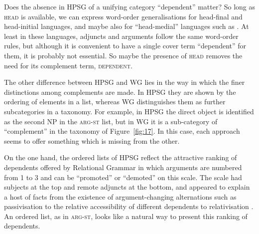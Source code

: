 \documentclass[output=paper
 	        ,biblatex
                ,babelshorthands
                ,newtxmath
                ,draftmode
                ,colorlinks, citecolor=brown
]{langscibook}
\begin{document}
Does the absence in HPSG of a unifying category ``dependent'' matter? So long as \textsc{head} is
available, we can express word-order generalisations for head-final and head-initial languages, and
maybe also for ``head-medial'' languages such as  \citep[172]{Hudson2010b-u}. At least
in these languages, adjuncts and arguments follow the same word-order rules, but although it is
convenient to have a single cover term ``dependent'' for them, it is probably not essential. So
maybe the presence of \textsc{head} removes the need for its complement term, \textsc{dependent}.

The other difference between HPSG and WG lies in the way in which the finer distinctions among
complements are made. In HPSG they are shown by the ordering of elements in a list, whereas WG
distinguishes them as further subcategories in a taxonomy. For example, in HPSG the direct object is
identified as the second NP in the \textsc{arg-st} list, but in WG it is a sub-category of
``complement'' in the taxonomy of Figure~\ref{fig:17}. In this case, each approach seems to offer
something which is missing from the other.

On the one hand, the ordered lists of HPSG reflect the attractive ranking of dependents offered by
Relational Grammar \citep{PP83a-u,Blake1990} in which arguments are numbered from 1 to 3 and can be
``promoted'' or ``demoted'' on this scale. The scale had subjects at the top and remote adjuncts at
the bottom, and appeared to explain a host of facts from the existence of argument-changing
alternations such as passivisation \citep{Levin93a-u} to the relative accessibility of different
dependents to relativisation \citep{KC77a}. An ordered list, as in \textsc{arg-st}, looks like a
natural way to present this ranking of dependents.
\end{document}
